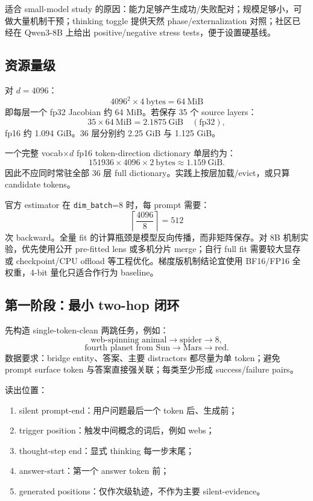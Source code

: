 \documentclass[10.5pt,a4paper]{ctexart}
\begin{document}
适合 small-model study 的原因：能力足够产生成功/失败配对；规模足够小，可做大量机制干预；thinking toggle 提供天然 phase/externalization 对照；社区已经在 Qwen3-8B 上给出 positive/negative stress tests，便于设置硬基线。

\subsection{资源量级}
对 $d=4096$：
\[
4096^2\times4\ \mathrm{bytes}=64\ \mathrm{MiB}
\]
即每层一个 fp32 Jacobian 约 64 MiB。若保存 35 个 source layers：
\[
35\times64\ \mathrm{MiB}=2.1875\ \mathrm{GiB}\quad(\mathrm{fp32}),
\]
fp16 约 1.094 GiB。36 层分别约 2.25 GiB 与 1.125 GiB。

一个完整 vocab$\times d$ fp16 token-direction dictionary 单层约为：
\[
151936\times4096\times2\ \mathrm{bytes}\approx1.159\ \mathrm{GiB}.
\]
因此不应同时常驻全部 36 层 full dictionary。实践上按层加载/evict，或只算 candidate tokens。

官方 estimator 在 \texttt{dim\_batch}=8 时，每 prompt 需要：
\[
\left\lceil\frac{4096}{8}\right\rceil=512
\]
次 backward。全量 fit 的计算瓶颈是模型反向传播，而非矩阵保存。对 8B 机制实验，优先使用公开 pre-fitted lens 或多机分片 merge；自行 full fit 需要较大显存或 checkpoint/CPU offload 等工程优化。梯度版机制结论宜使用 BF16/FP16 全权重，4-bit 量化只适合作行为 baseline。

\subsection{第一阶段：最小 two-hop 闭环}
先构造 single-token-clean 两跳任务，例如：
\[
\text{web-spinning animal}\rightarrow\text{spider}\rightarrow8,
\]
\[
\text{fourth planet from Sun}\rightarrow\text{Mars}\rightarrow\text{red}.
\]
数据要求：bridge entity、答案、主要 distractors 都尽量为单 token；避免 prompt surface token 与答案直接强关联；每类至少形成 success/failure pairs。

读出位置：
\begin{enumerate}
  \item silent prompt-end：用户问题最后一个 token 后、生成前；
  \item trigger position：触发中间概念的词后，例如 webs；
  \item thought-step end：显式 thinking 每一步末尾；
  \item answer-start：第一个 answer token 前；
  \item generated positions：仅作次级轨迹，不作为主要 silent-evidence。
\end{enumerate}
\end{document}
